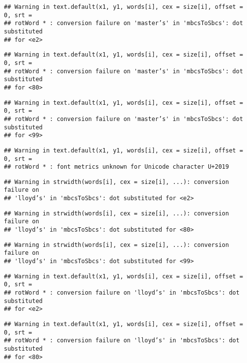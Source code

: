 \documentclass[
]{article}
\begin{document}
\begin{verbatim}
## Warning in text.default(x1, y1, words[i], cex = size[i], offset = 0, srt =
## rotWord * : conversion failure on 'master’s' in 'mbcsToSbcs': dot substituted
## for <e2>
\end{verbatim}

\begin{verbatim}
## Warning in text.default(x1, y1, words[i], cex = size[i], offset = 0, srt =
## rotWord * : conversion failure on 'master’s' in 'mbcsToSbcs': dot substituted
## for <80>
\end{verbatim}

\begin{verbatim}
## Warning in text.default(x1, y1, words[i], cex = size[i], offset = 0, srt =
## rotWord * : conversion failure on 'master’s' in 'mbcsToSbcs': dot substituted
## for <99>
\end{verbatim}

\begin{verbatim}
## Warning in text.default(x1, y1, words[i], cex = size[i], offset = 0, srt =
## rotWord * : font metrics unknown for Unicode character U+2019
\end{verbatim}

\begin{verbatim}
## Warning in strwidth(words[i], cex = size[i], ...): conversion failure on
## 'lloyd’s' in 'mbcsToSbcs': dot substituted for <e2>
\end{verbatim}

\begin{verbatim}
## Warning in strwidth(words[i], cex = size[i], ...): conversion failure on
## 'lloyd’s' in 'mbcsToSbcs': dot substituted for <80>
\end{verbatim}

\begin{verbatim}
## Warning in strwidth(words[i], cex = size[i], ...): conversion failure on
## 'lloyd’s' in 'mbcsToSbcs': dot substituted for <99>
\end{verbatim}

\begin{verbatim}
## Warning in text.default(x1, y1, words[i], cex = size[i], offset = 0, srt =
## rotWord * : conversion failure on 'lloyd’s' in 'mbcsToSbcs': dot substituted
## for <e2>
\end{verbatim}

\begin{verbatim}
## Warning in text.default(x1, y1, words[i], cex = size[i], offset = 0, srt =
## rotWord * : conversion failure on 'lloyd’s' in 'mbcsToSbcs': dot substituted
## for <80>
\end{verbatim}
\end{document}
